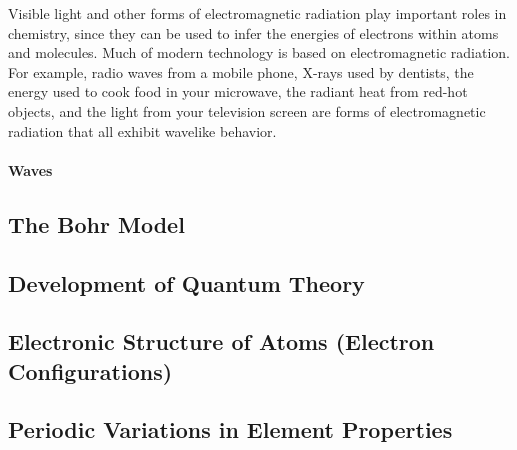 \documentclass{article}
\begin{document}
Visible light and other forms of electromagnetic radiation play important roles in chemistry, since they can be used to infer the energies of electrons within atoms and molecules. Much of modern technology is based on electromagnetic radiation. For example, radio waves from a mobile phone, X-rays used by dentists, the energy used to cook food in your microwave, the radiant heat from red-hot objects, and the light from your television screen are forms of electromagnetic radiation that all exhibit wavelike behavior.

\paragraph{Waves}

\subsection{The Bohr Model}
\subsection{Development of Quantum Theory}
\subsection{Electronic Structure of Atoms (Electron Configurations)}
\subsection{Periodic Variations in Element Properties}
\end{document}
